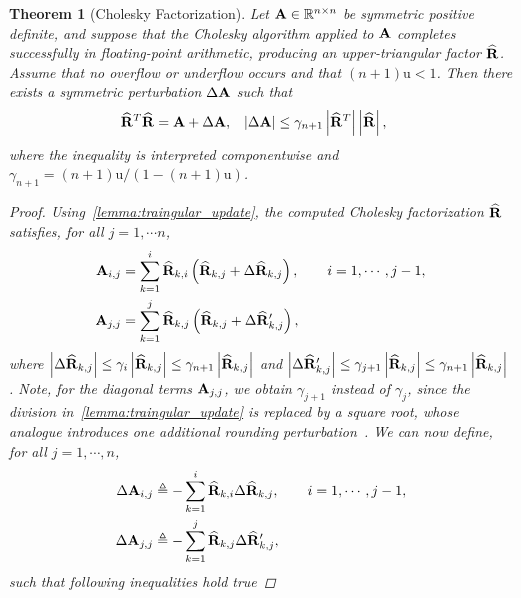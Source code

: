\documentclass[11pt,draft]{article}
\newcommand{\urd}{\ensuremath{\mathrm{u}}}
\newcommand{\define}{\ensuremath{\triangleq}}
\newcommand{\mat}[1]{\mathbf{\MakeUppercase{#1}}}
\newcommand{\ireal}[1]{\in\mathbb{R}^{#1}}
\newtheorem{theorem}{Theorem}[section]
\theoremstyle{definition}
\theoremstyle{remark}
\newcommand{\abs}[1]{\left|#1\right|}
\begin{document}
\begin{theorem}[Cholesky Factorization]\label{theorem:cholesky_factorization}
Let $\mat{a}\ireal{n\times n}$ be symmetric positive definite, and suppose
that the Cholesky algorithm applied to $\mat{a}$ completes successfully in
floating-point arithmetic, producing an upper-triangular factor
$\widehat{\mat{r}}$. Assume that no overflow or underflow occurs and that
$(n+1)\urd<1$. Then there exists a symmetric perturbation $\Delta\mat{a}$
such that
\begin{align}
    \widehat{\mat{r}}^{T}\widehat{\mat{r}}
    &=\mat{a}+\Delta\mat{a},
    &
    \abs{\Delta\mat{a}}
    &\leq
    \gamma_{n+1}
    \abs{\widehat{\mat{r}}^{T}}
    \abs{\widehat{\mat{r}}},
\end{align}
where the inequality is interpreted componentwise and
$\gamma_{n+1}=(n+1)\urd/(1-(n+1)\urd)$.
\begin{proof}
    Using~\cref{lemma:traingular_update}, the computed Cholesky factorization $\widehat{\mat{r}}$ satisfies, for all $j=1,\cdots n$,
    \begin{align}
        \mat{a}_{i,j} &= \sum_{k=1}^{i} \widehat{\mat{r}}_{k,i} \left(\widehat{\mat{r}}_{k,j} + \Delta \widehat{\mat{r}}_{k,j}\right), \qquad i = 1, \cdots, j - 1,\\ 
        \mat{a}_{j,j} &=  \sum_{k=1}^{j}  \widehat{\mat{r}}_{k,j}\left(\widehat{\mat{r}}_{k,j} + \Delta \widehat{\mat{r}}_{k,j}^{\prime}\right),
    \end{align}
    where $\abs{\Delta \widehat{\mat{r}}_{k,j}} \leq \gamma_{i}\abs{\widehat{\mat{r}}_{k,j}} \leq \gamma_{n+1}\abs{\widehat{\mat{r}}_{k,j}}$ and $\abs{\Delta \widehat{\mat{r}}_{k,j}^{\prime}} \leq \gamma_{j+1} \abs{\widehat{\mat{r}}_{k,j}}\leq \gamma_{n+1}\abs{\widehat{\mat{r}}_{k,j}}$.
    Note, for the diagonal terms $\mat{a}_{j,j}$, we obtain $\gamma_{j+1}$ instead of $\gamma_{j}$, since the division in~\cref{lemma:traingular_update} is replaced by a square root, whose analogue introduces one additional rounding perturbation~\cite[cf. Problem 10.3]{higham2002accuracy}.
    We can now define, for all $j=1,\cdots,n$,
    \begin{align}
        \Delta \mat{a}_{i,j} &\define - \sum_{k=1}^{i} \widehat{\mat{r}}_{k,i} \Delta \widehat{\mat{r}}_{k,j}, \qquad i = 1, \cdots, j - 1,\\
        \Delta \mat{a}_{j,j} &\define  - \sum_{k=1}^{j}  \widehat{\mat{r}}_{k,j} \Delta \widehat{\mat{r}}_{k,j}^{\prime},
    \end{align}
    such that following inequalities hold true 

\end{proof}
\end{theorem}
\end{document}
